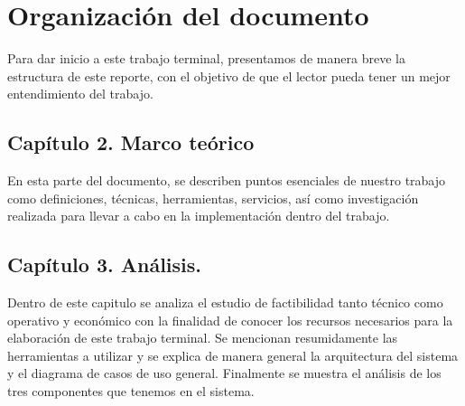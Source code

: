 \documentclass[12pt, a4paper, titlepage]{report}
\begin{document}
        \section{Organización del documento}
            Para dar inicio a este trabajo terminal, presentamos de manera breve la estructura de este reporte, con el objetivo de que el lector pueda tener un mejor entendimiento del trabajo.

            \subsection{Capítulo 2. Marco teórico}
                En esta parte del documento, se describen puntos esenciales de nuestro trabajo como definiciones, técnicas, herramientas, servicios, así como investigación realizada para llevar a cabo en la implementación dentro del trabajo. 
             
            \subsection{Capítulo 3. Análisis.}
                Dentro de este capitulo se analiza el estudio de factibilidad tanto t\'ecnico como operativo y económico con la finalidad de conocer los recursos necesarios para la elaboración de este trabajo terminal. Se mencionan resumidamente las herramientas a utilizar y se explica de manera general la arquitectura del sistema  y el diagrama de casos de uso general. Finalmente se muestra el análisis de los tres componentes que tenemos en el sistema.
             
\end{document}
